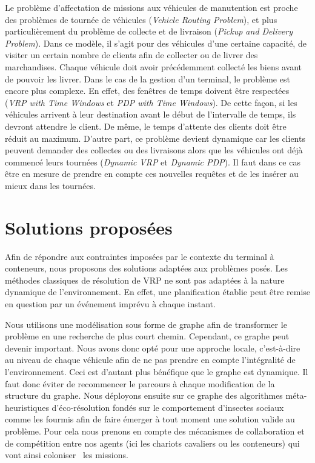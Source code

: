\documentclass{roadef2010}
\begin{document}
Le probl\`{e}me d'affectation de missions aux v\'{e}hicules de manutention est proche des probl\`{e}mes de tourn\'{e}e de v\'{e}hicules (\textit{Vehicle Routing Problem}\cite{Larsen00}), et plus particuli\`{e}rement du probl\`eme de collecte et de livraison (\textit{Pickup and Delivery Problem}\cite{Berbeglia07}).
Dans ce mod\`{e}le, il s'agit pour des v\'{e}hicules d'une certaine capacit\'{e}, de visiter un certain nombre de clients afin de collecter ou de livrer des marchandises.
Chaque v\'{e}hicule doit avoir pr\'{e}c\'{e}demment collect\'{e} les biens avant de pouvoir les livrer. Dans le cas de la gestion d'un terminal, le probl\`eme est encore plus complexe. En effet, des fen\^{e}tres de temps doivent \^{e}tre respect\'{e}es (\textit{VRP with Time Windows} et \textit{PDP with Time Windows}\cite{Mitrovic01}). De cette fa\c{c}on, si les v\'{e}hicules arrivent \`{a} leur destination avant le d\'{e}but de l'intervalle de temps, ils devront attendre le client. De m\^eme, le temps d'attente des clients doit \^etre r\'eduit au maximum. D'autre part, ce probl\`{e}me devient dynamique car les clients peuvent demander des collectes ou des livraisons alors que les v\'{e}hicules ont d\'{e}j\`{a} commenc\'{e} leurs tourn\'{e}es (\textit{Dynamic VRP} et \textit{Dynamic PDP}). Il faut dans ce cas \^{e}tre en mesure de prendre en compte ces nouvelles requ\^{e}tes et de les ins\'{e}rer au mieux dans les tourn\'{e}es.

\section{Solutions propos\'{e}es}
Afin de r\'{e}pondre aux contraintes impos\'{e}es par le contexte du terminal \`{a} conteneurs, nous proposons des solutions adapt\'ees aux probl\`emes pos\'es. Les m\'ethodes classiques de r\'esolution de VRP ne sont pas adapt\'ees \`a la nature dynamique de l'environnement. En effet, une planification \'etablie peut \^etre remise en question par un \'ev\'enement impr\'evu \`a chaque instant.

Nous utilisons une mod\'{e}lisation sous forme de graphe afin de transformer le probl\`{e}me en une recherche de plus court chemin.
Cependant, ce graphe peut devenir important. Nous avons donc opt\'{e} pour une approche locale, c'est-\`{a}-dire au niveau de chaque v\'{e}hicule afin de ne pas prendre en compte l'int\'{e}gralit\'{e} de l'environnement. Ceci est d'autant plus b\'{e}n\'{e}fique que le graphe est dynamique. Il faut donc \'{e}viter de recommencer le parcours \`{a} chaque modification de la structure du graphe. Nous d\'{e}ployons ensuite sur ce graphe des algorithmes m\'{e}ta-heuristiques d'\'{e}co-r\'{e}solution fond\'{e}s sur le comportement d'insectes sociaux comme les fourmis\cite{Dorigo91} afin de faire \'{e}merger \`{a} tout moment une solution valide au probl\`{e}me.
Pour cela nous prenons en compte des m\'{e}canismes de collaboration et de comp\'{e}tition\cite{Bertelle02} entre nos agents (ici les chariots cavaliers ou les conteneurs) qui vont ainsi \og coloniser \fg\ les missions. 
\end{document}
